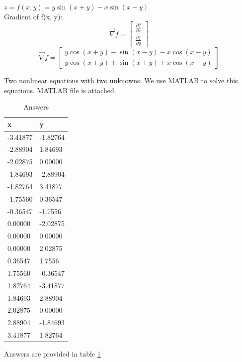 $z = f(x, y) = y\sin(x+y)-x\sin(x-y)$ \\
Gradient of f(x, y):
$$\vec{\nabla} f = \begin{bmatrix}
	\frac{\partial f}{\partial x} \\[6pt]
	\frac{\partial f}{\partial y}
\end{bmatrix} $$
$$\vec{\nabla} f = \begin{bmatrix}
	y \cos(x + y) - \sin(x - y) - x  \cos(x - y) \\
	y  \cos(x + y) + \sin(x + y) + x  \cos(x - y)
\end{bmatrix} $$

Two nonlinear equations with two unknowns. We use MATLAB to solve this equations. MATLAB file is attached.
\begin{table}[h]
				\caption {Answers} \label{ans} 
	\begin{center}
		\begin{tabular}{| l | l |}
			\hline
			x & y\\ \hline
			-3.41877 & -1.82764 \\ \hline
			-2.88904 & 1.84693 \\ \hline
			-2.02875 & 0.00000 \\ \hline
			-1.84693 & -2.88904 \\ \hline
			-1.82764 & 3.41877 \\ \hline
			-1.75560 & 0.36547 \\  \hline
			-0.36547 & -1.7556 \\ \hline
			0.00000 & -2.02875 \\ \hline
			0.00000 & 0.00000 \\ \hline
			0.00000 & 2.02875 \\ \hline
			0.36547 & 1.7556 \\ \hline
			1.75560 & -0.36547 \\ \hline
			1.82764 & -3.41877 \\ \hline
			1.84693 & 2.88904 \\ \hline
			2.02875 & 0.00000 \\ \hline
			2.88904 & -1.84693 \\ \hline
			3.41877 & 1.82764 \\ \hline
		\end{tabular}
	\end{center}
\end{table}
Answers are provided in table \ref{ans}


